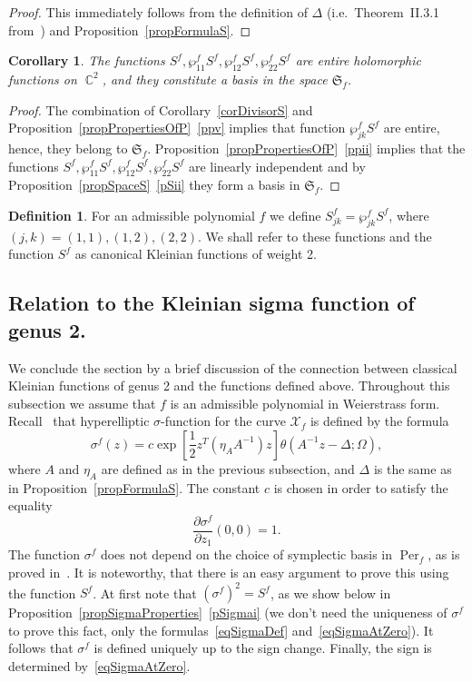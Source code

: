 \documentclass{amsart}
\numberwithin{equation}{section}
\newtheorem{corollary}[theorem]{Corollary}
\theoremstyle{definition}
\newtheorem{definition}[theorem]{Definition}
\theoremstyle{remark}
\DeclareMathOperator{\CC}{\mathbb C}
\DeclareMathOperator{\Per}{Per}
\begin{document}
	\begin{proof}
		This immediately follows from the definition of $\Delta$ (i.e.~Theorem~II.3.1 from~\cite{mumfordI}) and Proposition~\ref{propFormulaS}.
	\end{proof}
	\begin{corollary}\label{corBasisOfSpaceS}
		The functions $S^f, \wp_{11}^fS^f, \wp_{12}^fS^f, \wp_{22}^fS^f$ are entire holomorphic functions on $\CC^2$, and they constitute a basis in the space $\mathfrak S_f$. 
	\end{corollary}
	\begin{proof}
		The combination of Corollary~\ref{corDivisorS} and Proposition~\ref{propPropertiesOfP}~\ref{ppv} implies that function $\wp_{jk}^fS^f$ are entire, hence, they belong to $\mathfrak S_f$. Proposition~\ref{propPropertiesOfP}~\ref{ppii} implies that the functions $S^f, \wp_{11}^fS^f, \wp_{12}^fS^f, \wp_{22}^fS^f$ are linearly independent and by Proposition~\ref{propSpaceS}~\ref{pSii} they form a basis in $\mathfrak S_f$.
	\end{proof}
	
	\begin{definition}
		For an admissible polynomial $f$ we define $S^f_{jk} = \wp_{jk}^fS^f$, where $(j,k) = (1,1), (1,2), (2,2)$. We shall refer to these functions and the function $S^f$ as canonical Kleinian functions of weight 2.
	\end{definition}
	
	\subsection{Relation to the Kleinian sigma function of genus 2.}
	
	We conclude the section by a brief discussion of the connection between classical Kleinian functions of genus 2 and the functions defined above. Throughout this subsection we assume that $f$ is an admissible polynomial in Weierstrass form. Recall~\cite{Buch} that hyperelliptic $\sigma$-function for the curve $\mathcal X_f$ is defined by the formula
	\begin{equation}\label{eqSigmaDef}
		\sigma^f(z) = c\exp\left[\frac{1}{2}z^T(\eta_AA^{-1})z\right]\theta(A^{-1}z - \Delta; \Omega),
	\end{equation}
	where $A$ and $\eta_A$ are defined as in the previous subsection, and $\Delta$ is the same as in Proposition~\ref{propFormulaS}. The constant $c$ is chosen in order to satisfy the equality
	\begin{equation}\label{eqSigmaAtZero}
		\frac{\partial \sigma^f}{\partial z_1}(0,0) = 1.
	\end{equation}
	The function $\sigma^f$ does not depend on the choice of symplectic basis in $\Per_f$, as is proved in~\cite{Buch}. It is noteworthy, that there is an easy argument to prove this using the function $S^f$. At first note that $\left(\sigma^f\right)^2 = S^f$, as we show below in Proposition~\ref{propSigmaProperties}~\ref{pSigmai} (we don't need the uniqueness of $\sigma^f$ to prove this fact, only the formulas~\eqref{eqSigmaDef} and~\eqref{eqSigmaAtZero}). It follows that $\sigma^f$ is defined uniquely up to the sign change. Finally, the sign is determined by~\eqref{eqSigmaAtZero}. 
	
\end{document}
